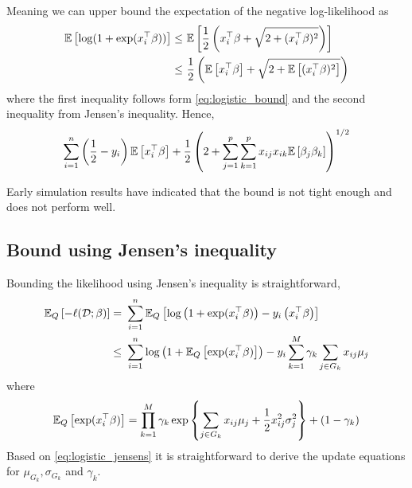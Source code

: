 Meaning we can upper bound the expectation of the negative log-likelihood as
\begin{align*}
    \mathbb{E} \left[ \log(1 + \exp(x_i^\top \beta)) \right]
    \leq &\
	\mathbb{E} \left[ 
	    \frac{1}{2} \left( x_i^\top \beta + 
	    \sqrt{2 + (x_i^\top \beta)^2} \right) 
	\right] \\
    \leq &\
	\frac{1}{2} \left( 
	    \mathbb{E} \left[ x_i^\top \beta \right] + 
	    \sqrt{2 + \mathbb{E} \left[(x_i^\top \beta)^2 \right]} 
	\right)
\end{align*}
where the first inequality follows form \eqref{eq:logistic_bound} and the second inequality from Jensen's inequality. Hence,
\begin{equation}
    \sum_{i=1}^n
    \left( \frac{1}{2} - y_i \right) \mathbb{E} \left[ x_i^\top \beta \right] + 
    \frac{1}{2} \left( 2 + \sum_{j=1}^p \sum_{k=1}^p x_{ij} x_{ik} 
    \mathbb{E} \left[ \beta_j \beta_k \right] \right)^{1/2}
\end{equation}

Early simulation results have indicated that the bound is not tight enough and does not perform well. 

\subsection{Bound using Jensen's inequality}

Bounding the likelihood using Jensen's inequality is straightforward,
\begin{align}
    \E_Q \left[ - \ell(\D; \beta) \right]
    =&\ 
	\sum_{i=1}^n  \E_Q \left[
	    \log \left(1 + \exp(x_i^\top \beta) \right) 
	    -
	    y_i \left( x_i^\top \beta \right) 
	\right] 
    \nonumber \\
    \leq &\ 
	\sum_{i=1}^n  
	    \log \left(1 + \E_Q \left[ \exp(x_i^\top \beta) \right] \right) 
	    -
	    y_i \sum_{k=1}^M \gamma_k \sum_{j \in G_k} x_{ij} \mu_{j}
    \label{eq:logistic_jensens}
\end{align}
where
\begin{equation*}
    \mathbb{E}_Q \left[ \exp(x_i^\top \beta) \right]
    =	
	\prod_{k=1}^M \gamma_k \exp \left\{ 
	    \sum_{j \in G_k} 
	    x_{ij} \mu_{j}
	    + 
	    \frac{1}{2} x_{ij}^2 \sigma_{j}^2
	\right\}
	+
	(1- \gamma_k)
\end{equation*}
Based on \eqref{eq:logistic_jensens} it is straightforward to derive the update equations for $\mu_{G_k}, \sigma_{G_k}$ and $\gamma_k$.


